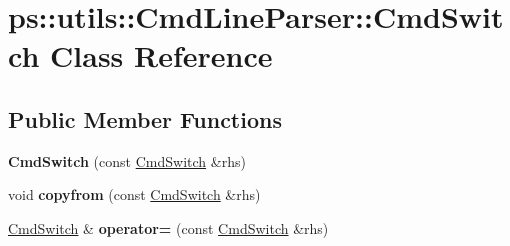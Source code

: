 \hypertarget{classps_1_1utils_1_1CmdLineParser_1_1CmdSwitch}{}\section{ps\+:\+:utils\+:\+:Cmd\+Line\+Parser\+:\+:Cmd\+Switch Class Reference}
\label{classps_1_1utils_1_1CmdLineParser_1_1CmdSwitch}
\subsection*{Public Member Functions}
\begin{DoxyCompactItemize}
\item 
\hypertarget{classps_1_1utils_1_1CmdLineParser_1_1CmdSwitch_a801ddcda99803869be6f1f636cd65e98}{}{\bfseries Cmd\+Switch} (const \hyperlink{classps_1_1utils_1_1CmdLineParser_1_1CmdSwitch}{Cmd\+Switch} \&rhs)\label{classps_1_1utils_1_1CmdLineParser_1_1CmdSwitch_a801ddcda99803869be6f1f636cd65e98}

\item 
\hypertarget{classps_1_1utils_1_1CmdLineParser_1_1CmdSwitch_a727e5558f823d5abc7e8a89d383c2e3c}{}void {\bfseries copyfrom} (const \hyperlink{classps_1_1utils_1_1CmdLineParser_1_1CmdSwitch}{Cmd\+Switch} \&rhs)\label{classps_1_1utils_1_1CmdLineParser_1_1CmdSwitch_a727e5558f823d5abc7e8a89d383c2e3c}

\item 
\hypertarget{classps_1_1utils_1_1CmdLineParser_1_1CmdSwitch_a4c986bfc00ce55112cc702d18eb69cf3}{}\hyperlink{classps_1_1utils_1_1CmdLineParser_1_1CmdSwitch}{Cmd\+Switch} \& {\bfseries operator=} (const \hyperlink{classps_1_1utils_1_1CmdLineParser_1_1CmdSwitch}{Cmd\+Switch} \&rhs)\label{classps_1_1utils_1_1CmdLineParser_1_1CmdSwitch_a4c986bfc00ce55112cc702d18eb69cf3}

\end{DoxyCompactItemize}

